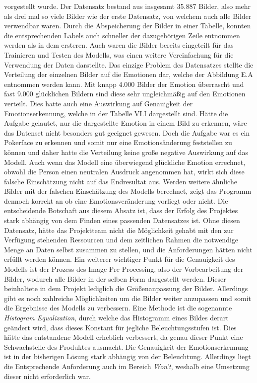 \documentclass[12pt, a4paper]{report}
\begin{document}
 vorgestellt wurde. Der Datensatz bestand aus insgesamt 35.887 Bilder, also mehr als drei mal so viele Bilder wie der erste Datensatz, von welchem auch alle Bilder verwendbar waren. Durch die Abspeicherung der Bilder in einer Tabelle, konnten die entsprechenden Labels auch schneller der dazugehörigen Zeile entnommen werden als in dem ersteren. Auch waren die Bilder bereits eingeteilt für das Trainieren und Testen des Modells, was einen weitere Vereinfachung für die Verwendung der Daten darstellte. Das einzige Problem des Datensatzes stellte die Verteilung der einzelnen Bilder auf die Emotionen dar, welche der Abbildung E.A entnommen werden kann. Mit knapp 4.000 Bilder der Emotion überrascht und fast 9.000 glücklichen Bildern sind diese sehr ungleichmäßig auf den Emotionen verteilt. Dies hatte auch eine Auswirkung auf  Genauigkeit der Emotionserkennung, welche in der Tabelle VI.I dargestellt sind. Hätte die Aufgabe gelautet, nur die dargestellte Emotion in einem Bild zu erkennen, wäre das Datenset nicht besonders gut geeignet gewesen. Doch die Aufgabe war es ein Pokerface zu erkennen und somit nur eine Emotionsänderung feststellen zu können und daher hatte die Verteilung keine große negative Auswirkung auf das Modell. Auch wenn das Modell eine überwiegend glückliche Emotion errechnet, obwohl die Person einen neutralen Ausdruck angenommen hat, wirkt sich diese falsche Einschätzung nicht auf das Endresultat aus. Werden weitere ähnliche Bilder mit der falschen Einschätzung des Modells berechnet, zeigt das Programm dennoch korrekt an ob eine Emotionsveränderung vorliegt oder nicht. Die entscheidende Botschaft aus diesem Absatz ist, dass der Erfolg des Projektes stark abhängig von dem Finden eines passenden Datensatzes ist. Ohne diesen Datensatz, hätte das Projektteam nicht die Möglichkeit gehabt mit den zur Verfügung stehenden Ressourcen und dem zeitlichen Rahmen die notwendige Menge an Daten selbst zusammen zu stellen, und die Anforderungen hätten nicht erfüllt werden können.
\newline
Ein weiterer wichtiger Punkt für die Genauigkeit des Modells ist der Prozess des Image Pre-Processing, also der Vorbearbeitung der Bilder, wodurch alle Bilder in der selben Form dargestellt werden. Dieser beinhaltete in dem Projekt lediglich die Größenanpassung der Bilder. Allerdings gibt es noch zahlreiche Möglichkeiten um die Bilder weiter anzupassen und somit die Ergebnisse des Modells zu verbessern. Eine Methode ist die sogenannte \textit{Histogram Equalization}, durch welche das Histogramm eines Bildes derart geändert wird, dass dieses Konstant für jegliche Beleuchtungsstufen ist. Dies hätte das entstandene Modell erheblich verbessert, da genau dieser Punkt eine Schwachstelle des Produktes ausmacht. Die Genauigkeit der Emotionserkennung ist in der bisherigen Lösung stark abhängig von der Beleuchtung. Allerdings liegt die Entsprechende Anforderung auch im Bereich \textit{Won't}, weshalb eine Umsetzung dieser nicht erforderlich war.
\end{document}
